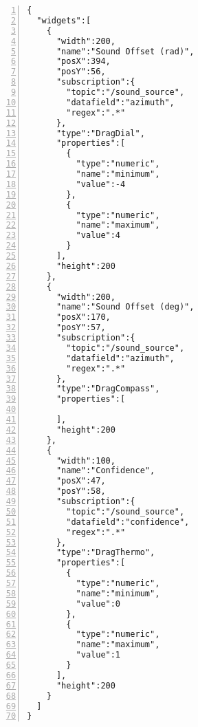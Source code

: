 \begin{lstlisting}[frame=single,caption={Saved dashboard from the NAO case study.},label=nao_dashboard_file,numbers=left, breaklines=true]
{
  "widgets":[
    {
      "width":200,
      "name":"Sound Offset (rad)",
      "posX":394,
      "posY":56,
      "subscription":{
        "topic":"/sound_source",
        "datafield":"azimuth",
        "regex":".*"
      },
      "type":"DragDial",
      "properties":[
        {
          "type":"numeric",
          "name":"minimum",
          "value":-4
        },
        {
          "type":"numeric",
          "name":"maximum",
          "value":4
        }
      ],
      "height":200
    },
    {
      "width":200,
      "name":"Sound Offset (deg)",
      "posX":170,
      "posY":57,
      "subscription":{
        "topic":"/sound_source",
        "datafield":"azimuth",
        "regex":".*"
      },
      "type":"DragCompass",
      "properties":[

      ],
      "height":200
    },
    {
      "width":100,
      "name":"Confidence",
      "posX":47,
      "posY":58,
      "subscription":{
        "topic":"/sound_source",
        "datafield":"confidence",
        "regex":".*"
      },
      "type":"DragThermo",
      "properties":[
        {
          "type":"numeric",
          "name":"minimum",
          "value":0
        },
        {
          "type":"numeric",
          "name":"maximum",
          "value":1
        }
      ],
      "height":200
    }
  ]
}
\end{lstlisting}


